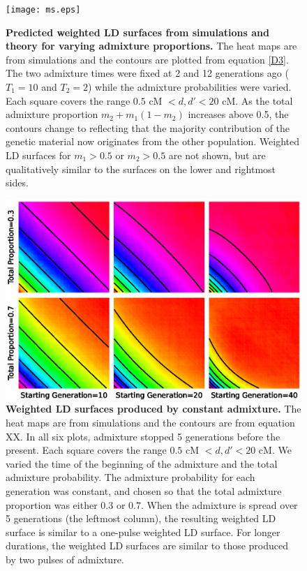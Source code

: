 \begin{table}
\begin{table}
[TODO: the color coding should be labeled for all figures.  Also, the y and
x-axes should be labeled]

\begin{figure} \texttt{[image: ms.eps]} \caption{ {\bf Predicted
weighted LD surfaces from simulations and theory for varying admixture
proportions.} The heat maps are from simulations and the contours are plotted
from equation \ref{D3}. The two admixture times were fixed at 2 and 12
generations ago ($T_1=10$ and $T_2=2$) while the admixture probabilities were
varied. Each square covers the range $0.5 \text{ cM }<d,d'<20\text{ cM}$. As the
total admixture proportion $m_2+m_1(1-m_2)$ increases above 0.5, the contours
change to reflecting that the majority contribution of the genetic material now
originates from the other population. Weighted LD surfaces for $m_1>0.5$ or
$m_2>0.5$ are not shown, but are qualitatively similar to the surfaces on the
lower and rightmost sides. } \label{ms} \end{figure}

\begin{figure} \includegraphics[scale=.8]{continuous.eps} \caption{ {\bf
Weighted LD surfaces produced by constant admixture.} The heat maps are from
simulations and the contours are from equation XX. In all six plots, admixture
stopped 5 generations before the present. Each square covers the range $0.5
\text{ cM }<d,d'<20\text{ cM}$. We varied the time of the beginning of the
admixture and the total admixture probability. The admixture probability for
each generation was constant, and chosen so that the total admixture proportion
was either $0.3$ or $0.7$. When the admixture is spread over 5 generations (the
leftmost column), the resulting weighted LD surface is similar to a one-pulse
weighted LD surface. For longer durations, the weighted LD surfaces are similar
to those produced by two pulses of admixture. } \label{continuous} \end{figure}


\end{table}
\end{table}

